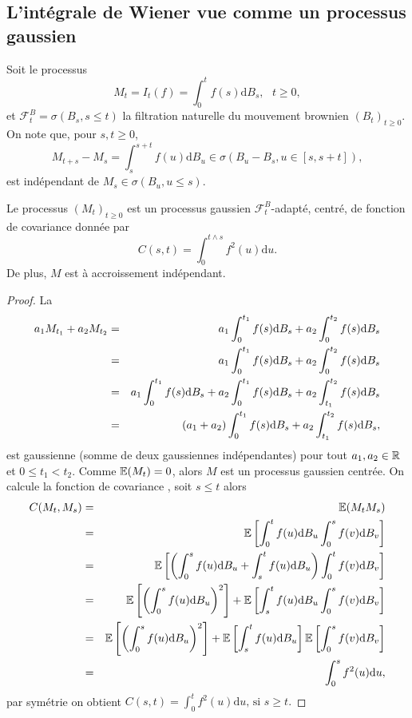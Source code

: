 \subsection{L'intégrale de Wiener vue comme un processus gaussien}
Soit le processus 
$$
M_t =I_t(f)= \int_{0}^t f(s)\text{d}B_s,\text{ }t\geq 0,
$$
et $\mathcal{F}_t^B = \sigma(B_s,s\leq t)$ la filtration naturelle du mouvement brownien $(B_t)_{t\geq 0}$. On note que, pour $s, t\geq 0$,
$$
M_{t+s}-M_s = \int_{s}^{s+t}f(u)\text{d}B_u\in\sigma(B_u - B_s, u\in[s, s+t]), 
$$
est indépendant de $M_s\in\sigma(B_u, u\leq s)$.
\begin{theo}
Le processus $(M_t)_{t\geq 0}$ est un processus gaussien $\mathcal{F}_t^B$-adapté, centré, de fonction de covariance donnée par 
$$
C(s,t) = \int_0^{t\land s}f^2(u)\text{d}u. 
$$
De plus, $M$ est à accroissement indépendant.
\end{theo}
\begin{proof}
La \va
\begin{eqnarray*}
a_1M_{t_1} + a_2M_{t_2}& =& a_1\int_0^{t_1}f(s)\text{d} B_s + a_2\int_0^{t_2}f(s)\text{d} B_s\\
& =& a_1\int_0^{t_1}f(s)\text{d} B_s + a_2\int_0^{t_2}f(s)\text{d} B_s\\
& =& a_1\int_0^{t_1}f(s)\text{d} B_s + a_2\int_0^{t_1}f(s)\text{d} B_s + a_2\int_{t_1}^{t_2}f(s)\text{d} B_s\\
& =& (a_1+a_2)\int_0^{t_1}f(s)\text{d} B_s +   a_2\int_{t_1}^{t_2}f(s)\text{d} B_s,
\end{eqnarray*}
est gaussienne (somme de deux gaussiennes indépendantes) pour tout $a_1, a_2\in \mathbb{R}$ et $0\leq t_1<t_2$. Comme $\mathbb{E}(M_t)=0$, alors $M$ est un processus gaussien centrée. On calcule la fonction de covariance , soit $s\leq t$ alors
\begin{eqnarray*}
C(M_t, M_s)&=&\mathbb{E}(M_tM_s)\\
&=&\mathbb{E}\left[\int_0^tf(u)\text{d}B_u\int_0^sf(v)\text{d}B_v\right]\\
&=&\mathbb{E}\left[\left(\int_0^sf(u)\text{d}B_u+ \int_s^tf(u)\text{d}B_u\right) \int_0^tf(v)\text{d}B_v\right]\\
&=&\mathbb{E}\left[\left(\int_0^sf(u)\text{d}B_u\right)^2\right]+\mathbb{E}\left[\int_s^tf(u)\text{d}B_u\int_0^sf(v)\text{d}B_v\right]\\
&=&\mathbb{E}\left[\left(\int_0^sf(u)\text{d}B_u\right)^2\right]+\mathbb{E}\left[\int_s^tf(u)\text{d}B_u\right]\mathbb{E}\left[\int_0^sf(v)\text{d}B_v\right]\\
&=&\int_0^sf^2(u)\text{d}u,
\end{eqnarray*}
par symétrie on obtient $C(s,t) =\int_0^tf^2(u)\text{d}u \text{, si }s\geq t.$

\end{proof}
